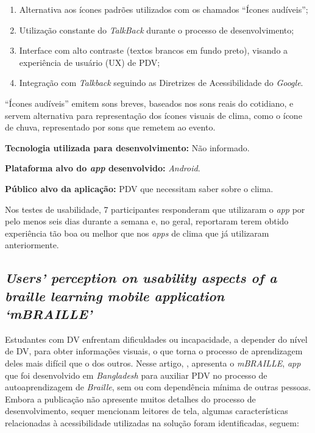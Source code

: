 \begin{enumerate}
    \item Alternativa aos ícones padrões utilizados com os chamados ``Ícones audíveis'';
    \item Utilização constante do \emph{TalkBack} durante o processo de desenvolvimento;
    \item Interface com alto contraste (textos brancos em fundo preto), visando a experiência de usuário (UX) de PDV\@;
    \item Integração com \emph{Talkback} seguindo as Diretrizes de Acessibilidade do \emph{Google}.
\end{enumerate}

``Ícones audíveis'' emitem sons breves, baseados nos sons reais do cotidiano, e servem alternativa para representação dos ícones visuais de clima, como o ícone de chuva, representado por sons que remetem ao evento.

\textbf{Tecnologia utilizada para desenvolvimento:} Não informado.

\textbf{Plataforma alvo do \emph{app} desenvolvido:} \emph{Android}.

\textbf{Público alvo da aplicação:} PDV que necessitam saber sobre o clima\@.

Nos testes de usabilidade, 7 participantes responderam que utilizaram o \emph{app} por pelo menos seis dias durante a semana e, no geral, reportaram terem obtido experiência tão boa ou melhor que nos \emph{apps} de clima que já utilizaram anteriormente.

\subsection{\emph{Users’ perception on usability aspects of a braille learning mobile application ‘mBRAILLE’}}

Estudantes com DV enfrentam dificuldades ou incapacidade, a depender do nível de DV, para obter informações visuais, o que torna o processo de aprendizagem deles mais difícil que o dos outros.
Nesse artigo, , apresenta o \emph{mBRAILLE}, \emph{app} que foi desenvolvido em \emph{Bangladesh} para auxiliar PDV no processo de autoaprendizagem de \emph{Braille}, sem ou com dependência mínima de outras pessoas.
Embora a publicação não apresente muitos detalhes do processo de desenvolvimento, sequer mencionam leitores de tela, algumas características relacionadas à acessibilidade utilizadas na solução foram identificadas, seguem:

